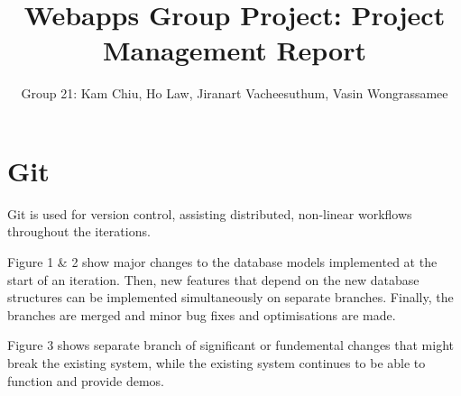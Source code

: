 \documentclass[11pt]{article}
\begin{document}
\title{Webapps Group Project: Project Management Report}
\author{Group 21: Kam Chiu, Ho Law, Jiranart Vacheesuthum, Vasin Wongrassamee}

\maketitle

\section{Git}
Git is used for version control, assisting distributed, non-linear workflows throughout the iterations.

Figure 1 \& 2 show major changes to the database models implemented at the start of an iteration. Then, new features that depend on the new database structures can be implemented simultaneously on separate branches. Finally, the branches are merged and minor bug fixes and optimisations are made.

Figure 3 shows separate branch of significant or fundemental changes that might break the existing system, while the existing system continues to be able to function and provide demos.
\end{document}

